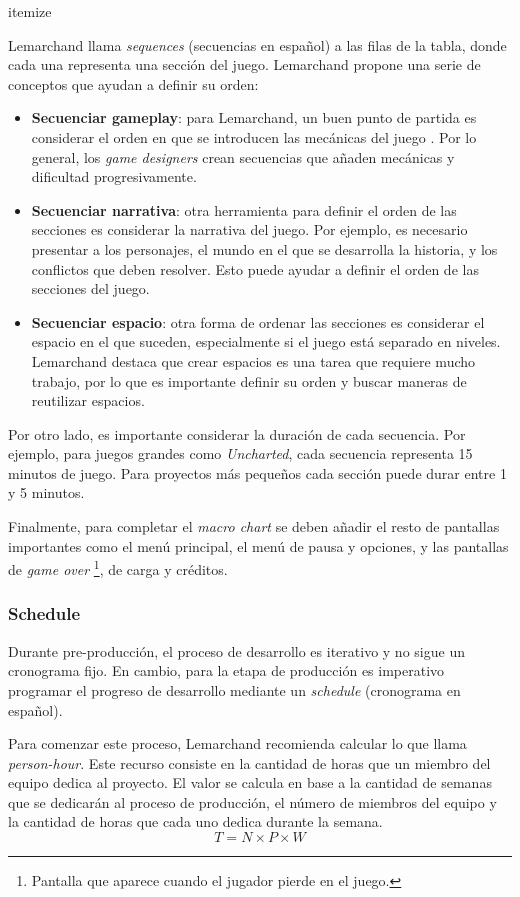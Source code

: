 {itemize}
\par Lemarchand llama \textit{sequences} (secuencias en español) a las filas de la tabla, donde cada una representa una sección del juego. Lemarchand propone una serie de conceptos que ayudan a definir su orden: 
\begin{itemize}
    \item \textbf{Secuenciar gameplay}: para Lemarchand, un buen punto de partida es considerar el orden en que se introducen las mecánicas del juego \cite{lemarchandPlayfulProductionProcess2021}. Por lo general, los \textit{game designers} crean secuencias que añaden mecánicas y dificultad progresivamente.
    \item \textbf{Secuenciar narrativa}: otra herramienta para definir el orden de las secciones es considerar la narrativa del juego. Por ejemplo, es necesario presentar a los personajes, el mundo en el que se desarrolla la historia, y los conflictos que deben resolver. Esto puede ayudar a definir el orden de las secciones del juego.
    \item \textbf{Secuenciar espacio}: otra forma de ordenar las secciones es considerar el espacio en el que suceden, especialmente si el juego está separado en niveles. Lemarchand destaca que crear espacios es una tarea que requiere mucho trabajo, por lo que es importante definir su orden y buscar maneras de reutilizar espacios.
\end{itemize}
\par Por otro lado, es importante considerar la duración de cada secuencia. Por ejemplo, para juegos grandes como \textit{Uncharted}, cada secuencia representa 15 minutos de juego. Para proyectos más pequeños cada sección puede durar entre 1 y 5 minutos. 
\par Finalmente, para completar el \textit{macro chart} se deben añadir el resto de pantallas importantes como el menú principal, el menú de pausa y opciones, y las pantallas de \textit{game over} \footnote{Pantalla que aparece cuando el jugador pierde en el juego.}, de carga y créditos.
%
%
\subsubsection{Schedule}
\par Durante pre-producción, el proceso de desarrollo es iterativo y no sigue un cronograma fijo. En cambio, para la etapa de producción es imperativo programar el progreso de desarrollo mediante un \textit{schedule} (cronograma en español).
\par Para comenzar este proceso, Lemarchand recomienda calcular lo que llama \textit{person-hour}. Este recurso consiste en la cantidad de horas que un miembro del equipo dedica al proyecto. El valor se calcula en base a la cantidad de semanas que se dedicarán al proceso de producción, el número de miembros del equipo y la cantidad de horas que cada uno dedica durante la semana.
\begin{equation}
    T = N \times P \times W
\end{equation}


